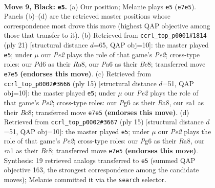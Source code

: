 \documentclass[11pt]{article}
\begin{document}
\clearpage

\begin{figure}[p]\centering
\begin{subfigure}{0.46\textwidth}\centering
\resizebox{\linewidth}{!}{%
\newchessgame
\chessboard[
  setfen={r1bq1rk1/1ppnp1bp/p2p1np1/5p2/PPPP3P/5NP1/4PPB1/RNBQ1RK1 b - - 0 9},
  showmover=false,
  pgfstyle=straightmove, color=movearrow, markmove={e7-e5}
]}
\caption{}
\end{subfigure}\hfill
\begin{subfigure}{0.46\textwidth}\centering
\resizebox{\linewidth}{!}{%
\newchessgame
\chessboard[
  setfen={r1bq1rk1/1ppnp1bp/p2p1np1/6B1/2PP4/2N2N1P/PP3PP1/R2QKB1R b KQ - 1 11},
  showmover=false,
  pgfstyle=straightmove, color=movearrow, markmove={e7-e5}
]}
\caption{}
\end{subfigure}
\\[4pt]
\begin{subfigure}{0.46\textwidth}\centering
\resizebox{\linewidth}{!}{%
\newchessgame
\chessboard[
  setfen={r1bq1rk1/pp1nppbp/2pp1np1/8/2PPP3/2N2NP1/PP3PBP/R1BQ1RK1 b - - 0 8},
  showmover=false,
  pgfstyle=straightmove, color=movearrow, markmove={e7-e5}
]}
\caption{}
\end{subfigure}\hfill
\begin{subfigure}{0.46\textwidth}\centering
\resizebox{\linewidth}{!}{%
\newchessgame
\chessboard[
  setfen={r1bq1rk1/pp1nppbp/2pp1np1/8/2PPP3/2N2NP1/PP3PBP/R1BQ1RK1 b - - 0 8},
  showmover=false,
  pgfstyle=straightmove, color=movearrow, markmove={e7-e5}
]}
\caption{}
\end{subfigure}
\caption{\textbf{Move 9, Black: \texttt{e5}.} (a) Our position; Melanie plays \texttt{e5} (\texttt{e7e5}). Panels (b)--(d) are the retrieved master positions whose correspondence most drove this move (highest QAP objective among those that transfer to it). (b) Retrieved from \texttt{ccrl\_top\_p0001\#1814} (ply 21) [structural distance $d$=65, QAP obj=10]: the master played \texttt{e5}; under $\mu$ our \emph{Pe2} plays the role of that game's \emph{Pe2}; cross-type roles: our \emph{P}d6 as their \emph{R}a8, our \emph{P}a6 as their \emph{B}c8; transferred move \texttt{e7e5} \textbf{(endorses this move)}. (c) Retrieved from \texttt{ccrl\_top\_p0002\#3666} (ply 15) [structural distance $d$=51, QAP obj=10]: the master played \texttt{e5}; under $\mu$ our \emph{Pe2} plays the role of that game's \emph{Pe2}; cross-type roles: our \emph{P}g6 as their \emph{R}a8, our \emph{r}a1 as their \emph{B}c8; transferred move \texttt{e7e5} \textbf{(endorses this move)}. (d) Retrieved from \texttt{ccrl\_top\_p0002\#3667} (ply 15) [structural distance $d$=51, QAP obj=10]: the master played \texttt{e5}; under $\mu$ our \emph{Pe2} plays the role of that game's \emph{Pe2}; cross-type roles: our \emph{P}g6 as their \emph{R}a8, our \emph{r}a1 as their \emph{B}c8; transferred move \texttt{e7e5} \textbf{(endorses this move)}. Synthesis: 19 retrieved analogs transferred to \texttt{e5} (summed QAP objective 163, the strongest correspondence among the candidate moves); Melanie committed it via the \texttt{search} selector.}
\label{fig:thought-m17}
\end{figure}
\end{document}
